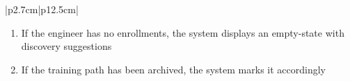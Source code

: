 \begin{table}[H]
\begin{tabular}{|p{2.7cm}|p{12.5cm}|}
\begin{minipage}[t]{\linewidth}
                                          \begin{enumerate}[topsep=0pt,itemsep=1pt,parsep=0pt,partopsep=0pt]
                                              \item If the engineer has no enrollments, the system displays an empty-state with
                                                    discovery suggestions
                                              \item If the training path has been archived, the system marks it accordingly
                                          \end{enumerate}
                                      \end{minipage}    \\
            \hline
        \end{tabular}
        \label{tab:eng-view-enrolled}
    \end{table}
